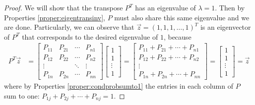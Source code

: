 \begin{proof}
We will show that the transpose $P^T$ has an eigenvalue of $\lambda = 1$. Then by Properties \ref{proper:eigentransinv}, $P$ must also share this same eigenvalue and we are done. Particularly, we can observe that $\vec{z} = (1,1,1,\ldots,1)^T$ is an eigenvector of $P^T$ that corresponds to the desired eigenvalue of $1$, because
\begin{align*}
P^T \vec{z} &= 
\begin{bmatrix}
P_{11} & P_{21} & \cdots & P_{n1} \\
P_{12} & P_{22} & \cdots & P_{n2} \\
\vdots & & \ddots & \vdots \\
P_{1n} & P_{2n} & \cdots & P_{nn}
\end{bmatrix}
\begin{bmatrix}
1 \\
1 \\
\vdots \\
1
\end{bmatrix}
=
\begin{bmatrix}
P_{11} + P_{21} + \cdots + P_{n1} \\
P_{12} + P_{22} + \cdots + P_{n2} \\
\vdots \\
P_{1n} + P_{2n} + \cdots + P_{nn}
\end{bmatrix}
=
\begin{bmatrix}
1 \\
1 \\
\vdots \\
1
\end{bmatrix}
= \vec{z}
\end{align*}
where by Properties \ref{proper:condprobsumto1} the entries in each column of $P$ sum to one: $P_{1j} + P_{2j} + \cdots + P_{nj} = 1$.
\end{proof}

